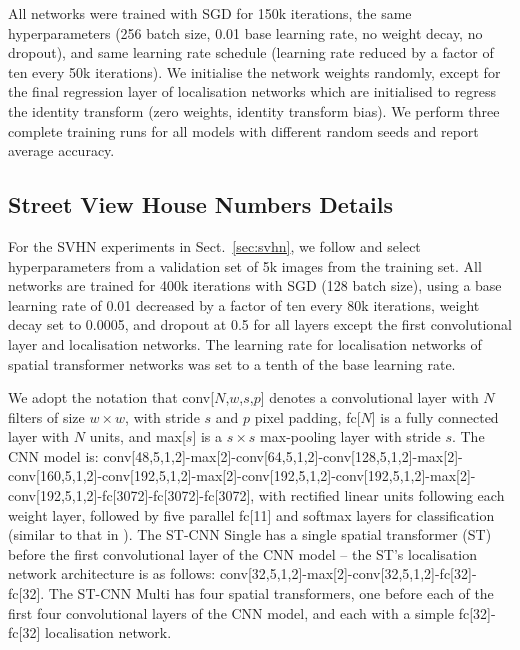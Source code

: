 \documentclass{article} %
\newcommand{\sref}[1]{Sect.~\ref{#1}}
\renewcommand{\paragraph}[1]{\par\noindent{\bf #1}}
\begin{document}
\begin{appendices}
\paragraph{Training.} All networks were trained with SGD for 150k iterations, the same hyperparameters (256 batch size, 0.01 base learning rate, no weight decay, no dropout), and same learning rate schedule (learning rate reduced by a factor of ten every 50k iterations). We initialise the network weights randomly, except for the final regression layer of localisation networks which are initialised to regress the identity transform (zero weights, identity transform bias). We perform three complete training runs for all models with different random seeds and report average accuracy.

\subsection{Street View House Numbers Details}\label{sec:moresvhn}
For the SVHN experiments in \sref{sec:svhn}, we follow \cite{Goodfellow13,Ba14} and select hyperparameters from a validation set of 5k images from the training set. All networks are trained for 400k iterations with SGD (128 batch size), using a base learning rate of 0.01 decreased by a factor of ten every 80k iterations, weight decay set to 0.0005, and dropout at 0.5 for all layers except the first convolutional layer and localisation networks. The learning rate for localisation networks of spatial transformer networks was set to a tenth of the base learning rate.

We adopt the notation that conv[$N$,$w$,$s$,$p$] denotes a convolutional layer with $N$ filters of size $w\times w$, with stride $s$ and $p$ pixel padding, fc[$N$] is a fully connected layer with $N$ units, and max[$s$] is a $s\times s$ max-pooling layer with stride $s$. The CNN model is: conv[48,5,1,2]-max[2]-conv[64,5,1,2]-conv[128,5,1,2]-max[2]-conv[160,5,1,2]-conv[192,5,1,2]-max[2]-conv[192,5,1,2]-conv[192,5,1,2]-max[2]-conv[192,5,1,2]-fc[3072]-fc[3072]-fc[3072], with rectified linear units following each weight layer, followed by five parallel fc[11] and softmax layers for classification (similar to that in \cite{Jaderberg14c}). The ST-CNN Single has a single spatial transformer (ST) before the first convolutional layer of the CNN model -- the ST's localisation network architecture is as follows: conv[32,5,1,2]-max[2]-conv[32,5,1,2]-fc[32]-fc[32]. The ST-CNN Multi has four spatial transformers, one before each of the first four convolutional layers of the CNN model, and each with a simple fc[32]-fc[32] localisation network.


\end{appendices}
\end{document}
